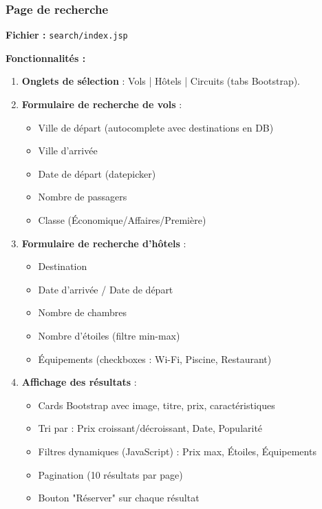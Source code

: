 \documentclass[12pt,a4paper]{report}
\begin{document}
\subsubsection{Page de recherche}

\textbf{Fichier :} \texttt{search/index.jsp}

\textbf{Fonctionnalités :}

\begin{enumerate}
    \item \textbf{Onglets de sélection} : Vols | Hôtels | Circuits (tabs Bootstrap).
    
    \item \textbf{Formulaire de recherche de vols} :
    \begin{itemize}
        \item Ville de départ (autocomplete avec destinations en DB)
        \item Ville d'arrivée
        \item Date de départ (datepicker)
        \item Nombre de passagers
        \item Classe (Économique/Affaires/Première)
    \end{itemize}
    
    \item \textbf{Formulaire de recherche d'hôtels} :
    \begin{itemize}
        \item Destination
        \item Date d'arrivée / Date de départ
        \item Nombre de chambres
        \item Nombre d'étoiles (filtre min-max)
        \item Équipements (checkboxes : Wi-Fi, Piscine, Restaurant)
    \end{itemize}
    
    \item \textbf{Affichage des résultats} :
    \begin{itemize}
        \item Cards Bootstrap avec image, titre, prix, caractéristiques
        \item Tri par : Prix croissant/décroissant, Date, Popularité
        \item Filtres dynamiques (JavaScript) : Prix max, Étoiles, Équipements
        \item Pagination (10 résultats par page)
        \item Bouton "Réserver" sur chaque résultat
    \end{itemize}
\end{enumerate}
\end{document}
